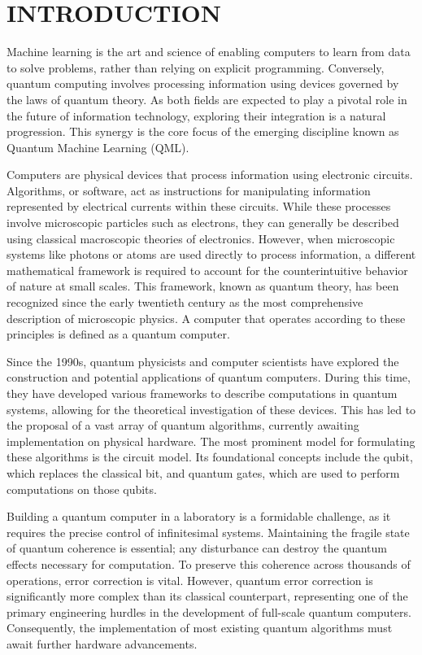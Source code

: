 \documentclass[en]{dimscthesis}
\begin{document}
\frontmatter

\mainmatter

\chapter{INTRODUCTION} \label{introduction}

Machine learning is the art and science of enabling computers to learn from data to solve problems, rather than relying on explicit programming. Conversely, quantum computing involves processing information using devices governed by the laws of quantum theory. As both fields are expected to play a pivotal role in the future of information technology, exploring their integration is a natural progression. This synergy is the core focus of the emerging discipline known as Quantum Machine Learning (QML).

Computers are physical devices that process information using electronic circuits. Algorithms, or software, act as instructions for manipulating information represented by electrical currents within these circuits. While these processes involve microscopic particles such as electrons, they can generally be described using classical macroscopic theories of electronics. However, when microscopic systems like photons or atoms are used directly to process information, a different mathematical framework is required to account for the counterintuitive behavior of nature at small scales. This framework, known as quantum theory, has been recognized since the early twentieth century as the most comprehensive description of microscopic physics. A computer that operates according to these principles is defined as a quantum computer.

Since the 1990s, quantum physicists and computer scientists have explored the construction and potential applications of quantum computers. During this time, they have developed various frameworks to describe computations in quantum systems, allowing for the theoretical investigation of these devices. This has led to the proposal of a vast array of quantum algorithms, currently awaiting implementation on physical hardware. The most prominent model for formulating these algorithms is the circuit model. Its foundational concepts include the qubit, which replaces the classical bit, and quantum gates, which are used to perform computations on those qubits.

Building a quantum computer in a laboratory is a formidable challenge, as it requires the precise control of infinitesimal systems. Maintaining the fragile state of quantum coherence is essential; any disturbance can destroy the quantum effects necessary for computation. To preserve this coherence across thousands of operations, error correction is vital. However, quantum error correction is significantly more complex than its classical counterpart, representing one of the primary engineering hurdles in the development of full-scale quantum computers. Consequently, the implementation of most existing quantum algorithms must await further hardware advancements.
\end{document}

